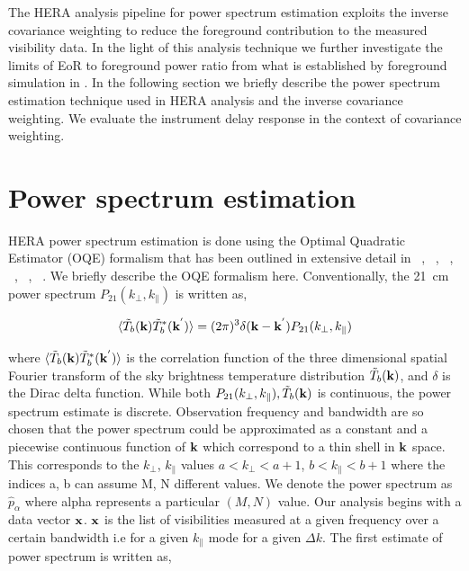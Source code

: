\documentclass[twocolumn]{emulateapj}
\begin{document}
 The HERA analysis pipeline for power spectrum estimation exploits the inverse covariance weighting to reduce the foreground contribution to the measured visibility data. In the light of this analysis technique we further investigate the limits of EoR to foreground power ratio from what is established by foreground simulation in \cite{Thyagarajan_et_al2016}. In the following section we briefly describe the power spectrum estimation technique used in HERA analysis and the inverse covariance weighting. We evaluate the instrument delay response in the context of covariance weighting.

    \section{\textbf{Power spectrum estimation}}    
    
    HERA power spectrum estimation is done using the Optimal Quadratic Estimator
    (OQE) formalism that has been outlined in extensive detail in  ~\cite{liu_et_al2010}, ~\cite{dillon_et_al2013a}, ~\cite{liu_et_al2014a}, ~\cite{liu_et_al2014b}, ~\cite{trott_et_al2012}, ~\cite{Ali_et_al2015}. We briefly  describe the OQE formalism here.
    Conventionally, the 21~cm power spectrum $P_{21}(k_\perp,k_\parallel)$ is written as, 
    
    \begin{equation}
    \langle  \tilde T_{b}(\bold k) \tilde T_{b}^{*}(\bold k^{'}) \rangle = (2\pi)^{3} \delta (\bold k - \bold k^{'})P_{21}(k_\perp,k_\parallel)
    \label{eq14}
    \end{equation}
    
    where $\langle  \tilde T_{b}(\bold k) \tilde T_{b}^{*}(\bold k^{'}) \rangle $ is the correlation function of the three dimensional spatial Fourier transform of the sky brightness temperature distribution $ \tilde T_{b}(\bold k)$, and $\delta$ is the Dirac delta function. While both $P_{21}(k_\perp,k_\parallel), \tilde T_{b}({\bold k})$ is continuous, the power spectrum estimate is discrete. Observation frequency and bandwidth are so chosen that the power spectrum could be approximated as a constant and a piecewise continuous function of $\bold k$  which correspond to a thin shell in $\bold k$ space. This corresponds to the $k_{\perp}$, $k_{\parallel}$  values $a <k_{\perp} < a+1$, $b <k_{\parallel} < b+1$ where the indices a, b can assume M, N different values.  We denote the power spectrum as $\hat p_{\alpha}$ where alpha represents a particular $(M,N)$ value. Our analysis begins with a data vector $\bold x$. $\bold x$ is the list of visibilities measured at a given frequency over a certain bandwidth i.e for a given $k_{\parallel}$ mode for a given $\Delta  k $. The first estimate of power spectrum is written as, 
    
\end{document}
